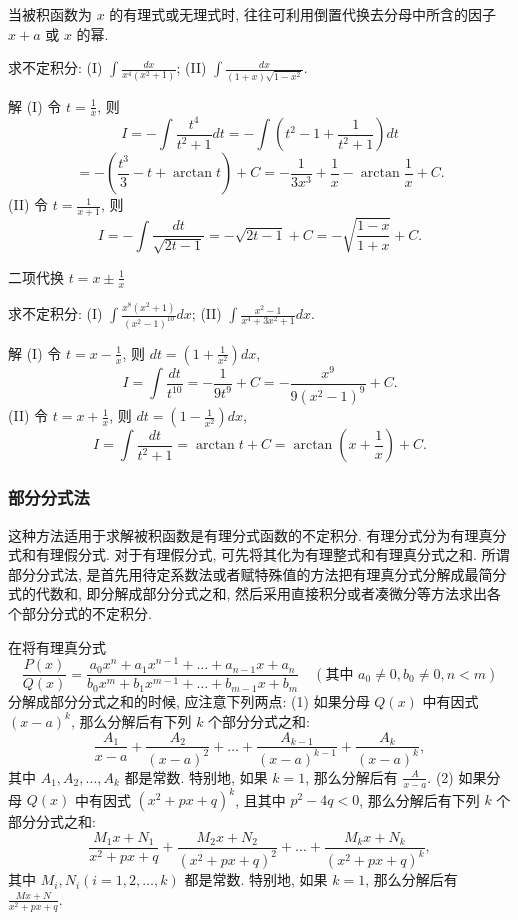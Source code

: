 \documentclass[lang=cn,newtx,10pt,scheme=chinese]{elegantbook}
\begin{document}
当被积函数为 $x$ 的有理式或无理式时, 往往可利用倒置代换去分母中所含的因子 $x + a$ 或 $x$ 的幂.

\begin{example}
  求不定积分: (I) $\int \frac{dx}{x^4(x^2 + 1)}$; (II) $\int \frac{dx}{(1 + x)\sqrt{1 - x^2}}$.
\end{example}
\begin{solution}
  解 (I) 令 $t = \frac{1}{x}$, 则
  $$
  I = -\int \frac{t^4}{t^2 + 1} dt = -\int \left(t^2 - 1 + \frac{1}{t^2 + 1}\right) dt
  $$
  $$
  = -\left(\frac{t^3}{3} - t + \arctan t\right) + C = -\frac{1}{3x^3} + \frac{1}{x} - \arctan \frac{1}{x} + C.
  $$
  (II) 令 $t = \frac{1}{x + 1}$, 则
  $$
  I = -\int \frac{dt}{\sqrt{2t - 1}} = -\sqrt{2t - 1} + C = -\sqrt{\frac{1 - x}{1 + x}} + C.
  $$
\end{solution}

 二项代换 $t = x \pm \frac{1}{x}$

\begin{example}
  求不定积分: (I) $\int \frac{x^8(x^2 + 1)}{(x^2 - 1)^{10}} dx$; (II) $\int \frac{x^2 - 1}{x^4 + 3x^2 + 1} dx$.
\end{example}
\begin{solution}
  解 (I) 令 $t = x - \frac{1}{x}$, 则 $dt = \left(1 + \frac{1}{x^2}\right) dx$,
  $$
  I = \int \frac{dt}{t^{10}} = -\frac{1}{9t^9} + C = -\frac{x^9}{9(x^2 - 1)^9} + C.
  $$
  (II) 令 $t = x + \frac{1}{x}$, 则 $dt = \left(1 - \frac{1}{x^2}\right) dx$,
  $$
  I = \int \frac{dt}{t^2 + 1} = \arctan t + C = \arctan \left(x + \frac{1}{x}\right) + C.
  $$
\end{solution}
    \subsubsection{部分分式法}

这种方法适用于求解被积函数是有理分式函数的不定积分. 有理分式分为有理真分式和有理假分式. 对于有理假分式, 可先将其化为有理整式和有理真分式之和. 所谓部分分式法, 是首先用待定系数法或者赋特殊值的方法把有理真分式分解成最简分式的代数和, 即分解成部分分式之和, 然后采用直接积分或者凑微分等方法求出各个部分分式的不定积分.

在将有理真分式
$$
\frac{P(x)}{Q(x)} = \frac{a_0 x^n + a_1 x^{n-1} + \dots + a_{n-1} x + a_n}{b_0 x^m + b_1 x^{m-1} + \dots + b_{m-1} x + b_m} \quad (\text{其中 } a_0 \ne 0, b_0 \ne 0, n < m)
$$
分解成部分分式之和的时候, 应注意下列两点:
(1) 如果分母 $Q(x)$ 中有因式 $(x - a)^k$, 那么分解后有下列 $k$ 个部分分式之和:
$$
\frac{A_1}{x - a} + \frac{A_2}{(x - a)^2} + \dots + \frac{A_{k-1}}{(x - a)^{k-1}} + \frac{A_k}{(x - a)^k},
$$
其中 $A_1, A_2, \dots, A_k$ 都是常数. 特别地, 如果 $k = 1$, 那么分解后有 $\frac{A}{x - a}$.
(2) 如果分母 $Q(x)$ 中有因式 $(x^2 + px + q)^k$, 且其中 $p^2 - 4q < 0$, 那么分解后有下列 $k$ 个部分分式之和:
$$
\frac{M_1 x + N_1}{x^2 + px + q} + \frac{M_2 x + N_2}{(x^2 + px + q)^2} + \dots + \frac{M_k x + N_k}{(x^2 + px + q)^k},
$$
其中 $M_i, N_i (i = 1, 2, \dots, k)$ 都是常数. 特别地, 如果 $k = 1$, 那么分解后有 $\frac{Mx + N}{x^2 + px + q}$.
\end{document}
